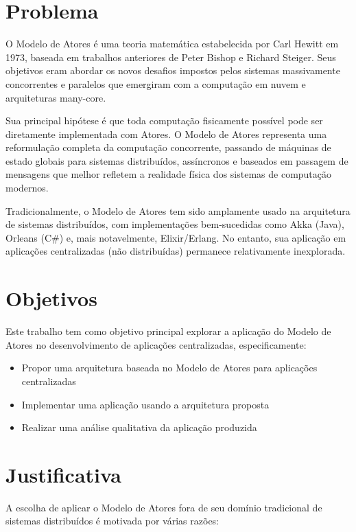 \section{Problema}

O Modelo de Atores é uma teoria matemática estabelecida por Carl Hewitt em 1973, baseada em trabalhos anteriores de Peter Bishop e Richard Steiger. Seus objetivos eram abordar os novos desafios impostos pelos sistemas massivamente concorrentes e paralelos que emergiram com a computação em nuvem e arquiteturas many-core.

Sua principal hipótese é que toda computação fisicamente possível pode ser diretamente implementada com Atores. O Modelo de Atores representa uma reformulação completa da computação concorrente, passando de máquinas de estado globais para sistemas distribuídos, assíncronos e baseados em passagem de mensagens que melhor refletem a realidade física dos sistemas de computação modernos.

Tradicionalmente, o Modelo de Atores tem sido amplamente usado na arquitetura de sistemas distribuídos, com implementações bem-sucedidas como Akka (Java), Orleans (C\#) e, mais notavelmente, Elixir/Erlang. No entanto, sua aplicação em aplicações centralizadas (não distribuídas) permanece relativamente inexplorada.

\section{Objetivos}

Este trabalho tem como objetivo principal explorar a aplicação do Modelo de Atores no desenvolvimento de aplicações centralizadas, especificamente:

\begin{itemize}
    \item Propor uma arquitetura baseada no Modelo de Atores para aplicações centralizadas
    \item Implementar uma aplicação usando a arquitetura proposta
    \item Realizar uma análise qualitativa da aplicação produzida
\end{itemize}

\section{Justificativa}

A escolha de aplicar o Modelo de Atores fora de seu domínio tradicional de sistemas distribuídos é motivada por várias razões:

